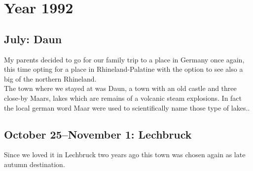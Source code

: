 \chapter{Year 1992}
\label{1992}

\section{July: Daun}
\label{1992:Daun}

My parents decided to go for our family trip to a place in Germany once again, this time opting for a place in Rhineland-Palatine with the option to see also a big of the northern Rhineland. \\ 

The town where we stayed at was Daun, a town with an old castle and three close-by Maars, lakes which are remains of a volcanic steam explosions. In fact the local german word Maar were used to scientifically name those type of lakes.. 





\section{October 25--November 1: Lechbruck}
\label{1992:Lechbruck}

Since we loved it in Lechbruck two years ago this town was chosen again as late autumn destination.\\

